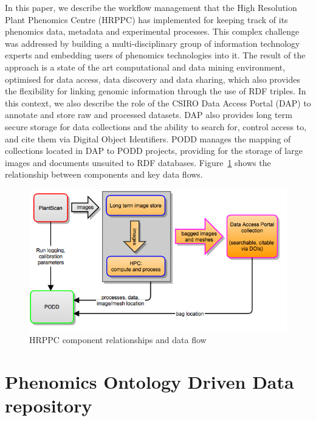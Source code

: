 \documentclass{llncs}
\begin{document}
In this paper, we describe the workflow management that the High Resolution
Plant Phenomics Centre (HRPPC) has implemented for keeping track of its
phenomics data, metadata and experimental processes. This complex challenge was
addressed by building a multi-disciplinary group of information technology
experts and embedding users of phenomics technologies into it. The result of the
approach is a state of the art computational and data mining environment,
optimised for data access, data discovery and data sharing, which also provides
the flexibility for linking genomic information through the use of RDF triples.
In this context, we also describe the role of the CSIRO Data Access Portal (DAP) \cite{DAP}
to annotate and store raw and processed datasets. DAP also
provides long term secure storage for data collections and the ability to search
for, control access to, and cite them via Digital Object Identifiers. PODD
manages the mapping of collections located in DAP to PODD projects, providing
for the storage of large images and documents unsuited to RDF databases. Figure~\ref{hrppccomponents} 
shows the relationship between components and key data flows.


\begin{figure}
\begin{center}
 \includegraphics[width=12cm,keepaspectratio=true]{plantscan-workflow-figure1.png}

\caption{HRPPC component relationships and data flow}
\label{hrppccomponents}
\end{center}
\end{figure}


\section{Phenomics Ontology Driven Data repository}
\end{document}
